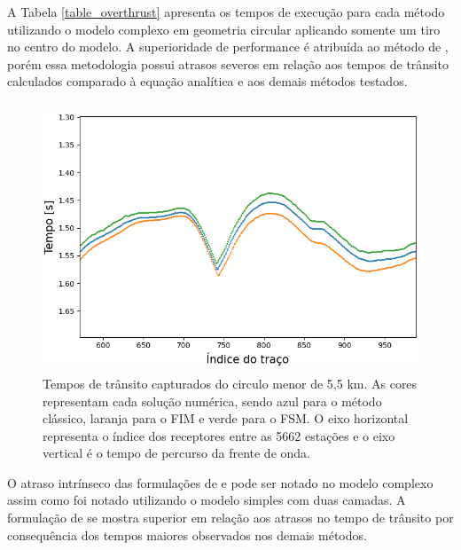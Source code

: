 A Tabela \ref{table_overthrust} apresenta os tempos de execução para cada método utilizando o modelo complexo em geometria circular aplicando somente um tiro no centro do modelo. A superioridade de performance é atribuída ao método de , porém essa metodologia possui atrasos severos em relação aos tempos de trânsito calculados comparado à equação analítica e aos demais métodos testados.

\begin{figure}[H]
	\centering
	\includegraphics[height=8cm,width=13cm]{Imgs/Resultados/complex_w1.png}		
	\caption{Tempos de trânsito capturados do circulo menor de 5,5 km. As cores representam cada solução numérica, sendo azul para o método clássico, laranja para o FIM e verde para o FSM. O eixo horizontal representa o índice dos receptores entre as 5662 estações e o eixo vertical é o tempo de percurso da frente de onda.}
	\label{fig:overthrust_inner_circle}
\end{figure}

O atraso intrínseco das formulações de  e  pode ser notado no modelo complexo assim como foi notado utilizando o modelo simples com duas camadas. A formulação de  se mostra superior em relação aos atrasos no tempo de trânsito por consequência dos tempos maiores observados nos demais métodos.

